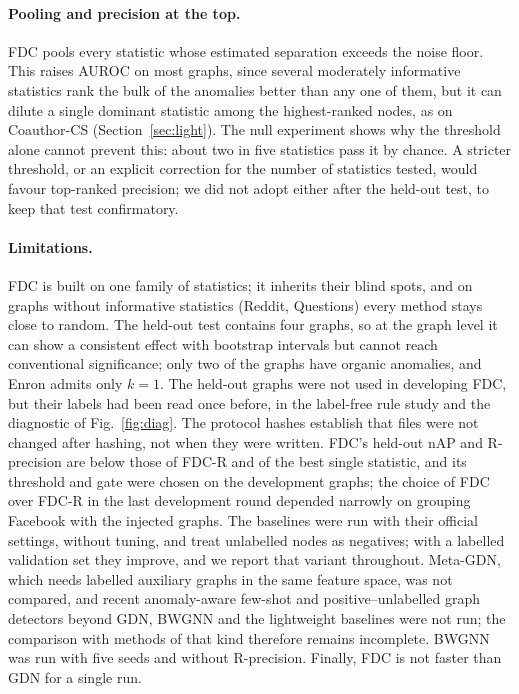 \documentclass[pdflatex,sn-mathphys-ay]{sn-jnl}
\theoremstyle{plain}
\theoremstyle{remark}
\begin{document}
\paragraph{Pooling and precision at the top.} FDC pools every statistic whose estimated separation exceeds the noise floor. This raises AUROC on most graphs, since several moderately informative statistics rank the bulk of the anomalies better than any one of them, but it can dilute a single dominant statistic among the highest-ranked nodes, as on Coauthor-CS (Section~\ref{sec:light}). The null experiment shows why the threshold alone cannot prevent this: about two in five statistics pass it by chance. A stricter threshold, or an explicit correction for the number of statistics tested, would favour top-ranked precision; we did not adopt either after the held-out test, to keep that test confirmatory.

\paragraph{Limitations.} FDC is built on one family of statistics; it inherits their blind spots, and on graphs without informative statistics (Reddit, Questions) every method stays close to random. The held-out test contains four graphs, so at the graph level it can show a consistent effect with bootstrap intervals but cannot reach conventional significance; only two of the graphs have organic anomalies, and Enron admits only $k=1$. The held-out graphs were not used in developing FDC, but their labels had been read once before, in the label-free rule study and the diagnostic of Fig.~\ref{fig:diag}. The protocol hashes establish that files were not changed after hashing, not when they were written. FDC's held-out nAP and R-precision are below those of FDC-R and of the best single statistic, and its threshold and gate were chosen on the development graphs; the choice of FDC over FDC-R in the last development round depended narrowly on grouping Facebook with the injected graphs. The baselines were run with their official settings, without tuning, and treat unlabelled nodes as negatives; with a labelled validation set they improve, and we report that variant throughout. Meta-GDN, which needs labelled auxiliary graphs in the same feature space, was not compared, and recent anomaly-aware few-shot and positive--unlabelled graph detectors beyond GDN, BWGNN and the lightweight baselines were not run; the comparison with methods of that kind therefore remains incomplete. BWGNN was run with five seeds and without R-precision. Finally, FDC is not faster than GDN for a single run.
\end{document}
